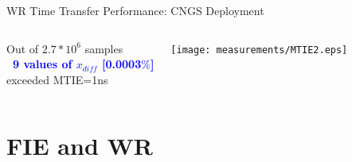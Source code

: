 \documentclass[compress,red]{beamer}
\begin{document}
\begin{frame}{WR Time Transfer Performance: CNGS Deployment}

  \begin{columns}[c]
	  \begin{center}

	    Out of $2.7*10^6$ samples\\
			\textbf{\textcolor{blue}{~9 values of $x_{diff}$ [0.0003$\%$]}} \\
                       exceeded MTIE=1ns
		


	  \end{center}
		\begin{center}
		\texttt{[image: measurements/MTIE2.eps]}
		\end{center}
  \end{columns}
\end{frame}


\section{FIE and WR}
\end{document}
